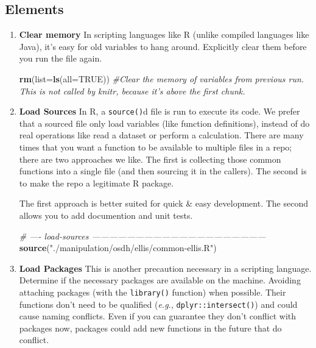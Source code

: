 \documentclass[]{book}
\newenvironment{Shaded}{\begin{snugshade}}{\end{snugshade}}
\newcommand{\CommentTok}[1]{\textcolor[rgb]{0.56,0.35,0.01}{\textit{#1}}}
\newcommand{\DataTypeTok}[1]{\textcolor[rgb]{0.13,0.29,0.53}{#1}}
\newcommand{\KeywordTok}[1]{\textcolor[rgb]{0.13,0.29,0.53}{\textbf{#1}}}
\newcommand{\NormalTok}[1]{#1}
\newcommand{\OtherTok}[1]{\textcolor[rgb]{0.56,0.35,0.01}{#1}}
\newcommand{\StringTok}[1]{\textcolor[rgb]{0.31,0.60,0.02}{#1}}
\begin{document}
\hypertarget{elements}{%
\subsection{Elements}\label{elements}}

\begin{enumerate}
\def\labelenumi{\arabic{enumi}.}
\item
  \textbf{Clear memory} In scripting languages like R (unlike compiled languages like Java), it's easy for old variables to hang around. Explicitly clear them before you run the file again.

\begin{Shaded}
\begin{Highlighting}[]
\KeywordTok{rm}\NormalTok{(}\DataTypeTok{list=}\KeywordTok{ls}\NormalTok{(}\DataTypeTok{all=}\OtherTok{TRUE}\NormalTok{)) }\CommentTok{#Clear the memory of variables from previous run. This is not called by knitr, because it's above the first chunk.}
\end{Highlighting}
\end{Shaded}
\item
  \textbf{Load Sources} In R, a \texttt{source()}d file is run to execute its code. We prefer that a sourced file only load variables (like function definitions), instead of do real operations like read a dataset or perform a calculation. There are many times that you want a function to be available to multiple files in a repo; there are two approaches we like. The first is collecting those common functions into a single file (and then sourcing it in the callers). The second is to make the repo a legitimate R package.

  The first approach is better suited for quick \& easy development. The second allows you to add documention and unit tests.

\begin{Shaded}
\begin{Highlighting}[]
\CommentTok{# ---- load-sources ------------------------------------------------------------}
\KeywordTok{source}\NormalTok{(}\StringTok{"./manipulation/osdh/ellis/common-ellis.R"}\NormalTok{)}
\end{Highlighting}
\end{Shaded}
\item
  \textbf{Load Packages} This is another precaution necessary in a scripting language. Determine if the necessary packages are available on the machine. Avoiding attaching packages (with the \texttt{library()} function) when possible. Their functions don't need to be qualified (\emph{e.g.}, \texttt{dplyr::intersect()}) and could cause naming conflicts. Even if you can guarantee they don't conflict with packages now, packages could add new functions in the future that do conflict.


\end{enumerate}
\end{document}
